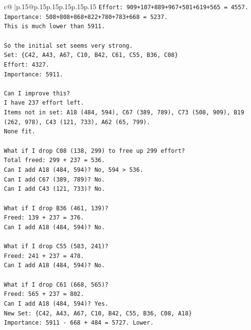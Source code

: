 \documentclass{article}
\begin{document}
{\begin{supertabular}{c@{$\;$}|p{.15\linewidth}@{}p{.15\linewidth}p{.15\linewidth}p{.15\linewidth}p{.15\linewidth}p{.15\linewidth}}
{{{\texttt{Effort: 909+107+889+967+501+619+565 = 4557.} \\
\texttt{Importance: 508+808+868+822+780+783+668 = 5237.} \\
\texttt{This is much lower than 5911.} \\
\\ 
\texttt{So the initial set seems very strong.} \\
\texttt{Set: \{C42, A43, A67, C10, B42, C61, C55, B36, C08\}} \\
\texttt{Effort: 4327.} \\
\texttt{Importance: 5911.} \\
\\ 
\texttt{Can I improve this?} \\
\texttt{I have 237 effort left.} \\
\texttt{Items not in set: A18 (484, 594), C67 (389, 789), C73 (508, 909), B19 (262, 978), C43 (121, 733), A62 (65, 799).} \\
\texttt{None fit.} \\
\\ 
\texttt{What if I drop C08 (138, 299) to free up 299 effort?} \\
\texttt{Total freed: 299 + 237 = 536.} \\
\texttt{Can I add A18 (484, 594)? No, 594 > 536.} \\
\texttt{Can I add C67 (389, 789)? No.} \\
\texttt{Can I add C43 (121, 733)? No.} \\
\\ 
\texttt{What if I drop B36 (461, 139)?} \\
\texttt{Freed: 139 + 237 = 376.} \\
\texttt{Can I add A18 (484, 594)? No.} \\
\\ 
\texttt{What if I drop C55 (583, 241)?} \\
\texttt{Freed: 241 + 237 = 478.} \\
\texttt{Can I add A18 (484, 594)? No.} \\
\\ 
\texttt{What if I drop C61 (668, 565)?} \\
\texttt{Freed: 565 + 237 = 802.} \\
\texttt{Can I add A18 (484, 594)? Yes.} \\
\texttt{New Set: \{C42, A43, A67, C10, B42, C55, B36, C08, A18\}} \\
\texttt{Importance: 5911 {-} 668 + 484 = 5727. Lower.} \\
}}}
\end{supertabular}}
\end{document}
